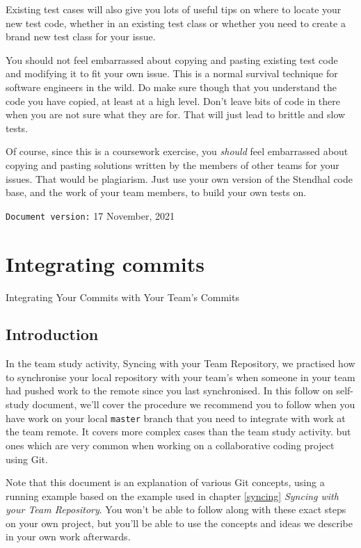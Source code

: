 \documentclass[
]{book}
\begin{document}
Existing test cases will also give you lots of useful tips on where to locate your new test code, whether in an existing test class or whether you need to create a brand new test class for your issue.

You should not feel embarrassed about copying and pasting existing test code and modifying it to fit your own issue. This is a normal survival technique for software engineers in the wild. Do make sure though that you understand the code you have copied, at least at a high level. Don't leave bits of code in there when you are not sure what they are for. That will just lead to brittle and slow tests.

Of course, since this is a coursework exercise, you \emph{should} feel embarrassed about copying and pasting solutions written by the members of other teams for your issues. That would be plagiarism. Just use your own version of the Stendhal code base, and the work of your team members, to build your own tests on.

\texttt{Document\ version:} 17 November, 2021

\hypertarget{committing}{%
\chapter{Integrating commits}\label{committing}}

Integrating Your Commits with Your Team's Commits

\hypertarget{commintro}{%
\section{Introduction}\label{commintro}}

In the team study activity, Syncing with your Team Repository, we practised how to synchronise your local repository with your team's when someone in your team had pushed work to the remote since you last synchronised. In this follow on self-study document, we'll cover the procedure we recommend you to follow when you have work on your local \texttt{master} branch that you need to integrate with work at the team remote. It covers more complex cases than the team study activity. but ones which are very common when working on a collaborative coding project using Git.

Note that this document is an explanation of various Git concepts, using a running example based on the example used in chapter \ref{syncing} \emph{Syncing with your Team Repository}. You won't be able to follow along with these exact steps on your own project, but you'll be able to use the concepts and ideas we describe in your own work afterwards.
\end{document}

